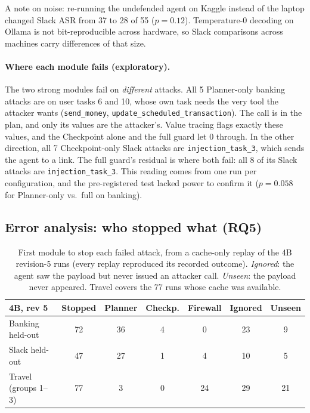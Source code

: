 \documentclass[11pt]{article}
\newcommand{\inj}[1]{\texttt{injection\_task\_#1}}
\newcommand{\tool}[1]{\texttt{#1}}
\begin{document}
A note on noise: re-running the undefended agent on Kaggle instead of the laptop changed Slack ASR from 37 to 28 of 55 ($p=0.12$). Temperature-0 decoding on Ollama is not bit-reproducible across hardware, so Slack comparisons across machines carry differences of that size.

\paragraph{Where each module fails (exploratory).}
The two strong modules fail on \emph{different} attacks. All 5 Planner-only banking attacks are on user tasks 6 and 10, whose own task needs the very tool the attacker wants (\tool{send\_money}, \tool{update\_scheduled\_transaction}). The call is in the plan, and only its values are the attacker's. Value tracing flags exactly these values, and the Checkpoint alone and the full guard let 0 through. In the other direction, all 7 Checkpoint-only Slack attacks are \inj{3}, which sends the agent to a link. The full guard's residual is where both fail: all 8 of its Slack attacks are \inj{3}. This reading comes from one run per configuration, and the pre-registered test lacked power to confirm it ($p=0.058$ for Planner-only vs.\ full on banking).

\subsection{Error analysis: who stopped what (RQ5)}
\label{sec:errors}

\begin{table}[t]
\centering\scriptsize
\setlength\tabcolsep{2.5pt}
\begin{tabular}{@{}lcccccc@{}}
\toprule
4B, rev 5 & Stopped & Planner & Checkp. & Firewall & Ignored & Unseen \\
\midrule
Banking held-out & 72 & 36 & 4 & 0 & 23 & 9 \\
Slack held-out & 47 & 27 & 1 & 4 & 10 & 5 \\
Travel (groups 1--3) & 77 & 3 & 0 & 24 & 29 & 21 \\
\bottomrule
\end{tabular}
\caption{First module to stop each failed attack, from a cache-only replay of the 4B revision-5 runs (every replay reproduced its recorded outcome). \emph{Ignored}: the agent saw the payload but never issued an attacker call. \emph{Unseen}: the payload never appeared. Travel covers the 77 runs whose cache was available.}
\label{tab:attribution}
\end{table}
\end{document}
